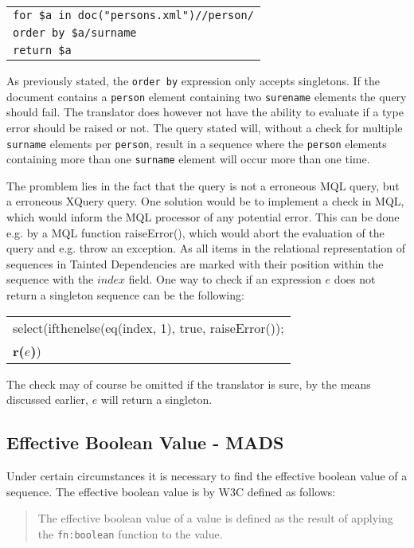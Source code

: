 \begin{center}
\begin{tabular}{l}
\texttt{for \$a in doc("persons.xml")//person/} \\
\texttt{order by \$a/surname} \\
\texttt{return \$a}
\end{tabular}
\end{center}

As previously stated, the \texttt{order by} expression only accepts singletons. If the document contains a
\texttt{person} element containing two \texttt{surename} elements the query should fail. The translator does
however not have the ability to evaluate if a type error should be raised or not. The query stated will, without a
check for multiple \texttt{surname} elements per \texttt{person}, result in a sequence where the \texttt{person}
elements containing more than one \texttt{surname} element will occur more than one time. 

The promblem lies in the fact that the query is not a erroneous MQL query, but a erroneous XQuery query. One
solution would be to implement a check in MQL, which would inform the MQL processor of any potential error. This
can be done e.g. by a MQL function \textsf{raiseError()}, which would abort the evaluation of the query and e.g.
throw an exception. As all items in the relational representation of sequences in Tainted Dependencies are marked
with their position within the sequence with the $index$ field. One way to check if an expression $e$ does not
return a singleton sequence can be the following:
\begin{center}
\begin{tabular}{l}
\textsf{select(ifthenelse(eq(index, 1), true, raiseError());} \\ \quad
\textbf{r(}$e$\textbf{)}\textsf{)}
\end{tabular}
\end{center}

The check may of course be omitted if the translator is sure, by the means discussed earlier, $e$ will return a
singleton.

\subsection{Effective Boolean Value - {MADS}}
\label{sect:disc:effBool}
Under certain circumstances it is necessary to find the effective boolean value of a sequence. The effective
boolean value is by W3C defined as follows\cite{w3c00}: 
\begin{quote}
The effective boolean value of a value is defined as the result of applying the \texttt{fn:boolean} function to
the value.
\end{quote}


